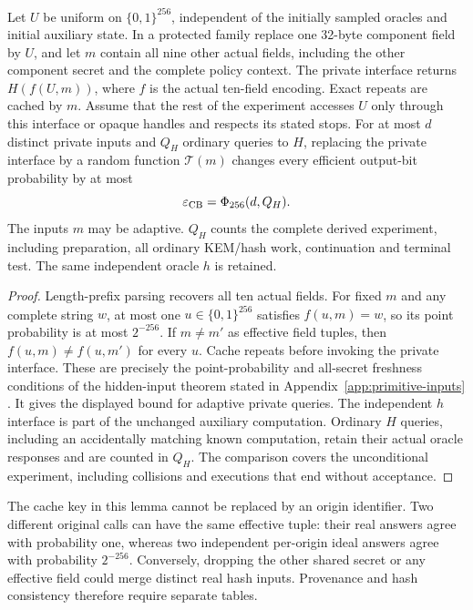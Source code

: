 \begin{lemma}
\label{lem:cb-hidden-component}
Let $U$ be uniform on $\{0,1\}^{256}$, independent of the initially sampled
oracles and initial auxiliary state. In a protected family replace one
32-byte component field by $U$, and let $m$ contain all nine other actual
fields, including the other component secret and the complete policy
context. The private interface returns
$H(f(U,m))$, where $f$ is the actual ten-field encoding. Exact repeats are
cached by $m$. Assume that the rest of the experiment accesses $U$ only
through this interface or opaque handles and respects its stated stops.
For at most $d$ distinct private inputs and $Q_H$ ordinary queries to $H$,
replacing the private interface by a random function $\mathcal T(m)$
changes every efficient output-bit probability by at most
\begin{equation}
 \varepsilon_{\rm CB}=\Phi_{256}(d,Q_H).
 \label{eq:cb-hidden-cost}
\end{equation}
The inputs $m$ may be adaptive. $Q_H$ counts the complete derived
experiment, including preparation, all ordinary KEM/hash work, continuation
and terminal test. The same independent oracle $h$ is retained.
\end{lemma}
\begin{proof}
Length-prefix parsing recovers all ten actual fields. For fixed $m$ and any
complete string $w$, at most one $u\in\{0,1\}^{256}$ satisfies
$f(u,m)=w$, so its point probability is at most $2^{-256}$. If $m\ne m'$
as effective field tuples, then $f(u,m)\ne f(u,m')$ for every $u$.
Cache repeats before invoking the private interface. These are precisely
the point-probability and all-secret freshness conditions of the
hidden-input theorem stated in Appendix~\ref{app:primitive-inputs}
\cite[Theorem~2]{dfh2022}. It gives the displayed bound for adaptive
private queries. The independent $h$ interface is part of the unchanged
auxiliary computation. Ordinary $H$ queries, including an accidentally
matching known computation, retain their actual oracle responses and are
counted in $Q_H$. The comparison covers the unconditional experiment,
including collisions and executions that end without acceptance.
\end{proof}

The cache key in this lemma cannot be replaced by an origin identifier.
Two different original calls can have the same effective tuple: their real
answers agree with probability one, whereas two independent per-origin
ideal answers agree with probability $2^{-256}$. Conversely, dropping the
other shared secret or any effective field could merge distinct real hash
inputs. Provenance and hash consistency therefore require separate tables.

